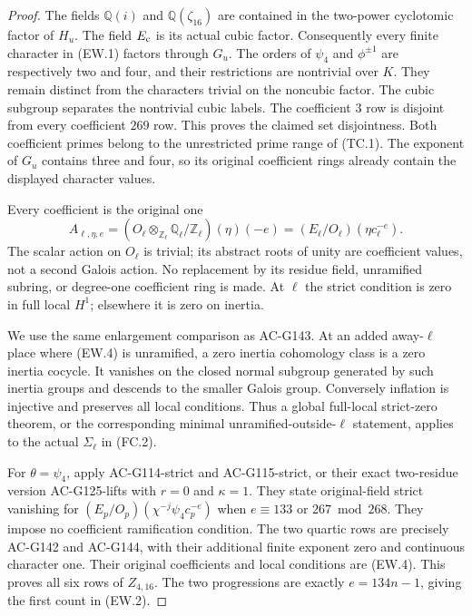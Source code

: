 \begin{proof}
The fields $\mathbb Q(i)$ and $\mathbb Q(\zeta_{16})$ are contained
in the two-power cyclotomic factor of $H_u$.
The field $E_{\rm c}$ is its actual cubic factor.
Consequently every finite character in (EW.1) factors through $G_u$.
The orders of $\psi_4$ and $\phi^{\pm1}$ are respectively two and four,
and their restrictions are nontrivial over $K$.
They remain distinct from the characters trivial on the noncubic
factor.  The cubic subgroup separates the nontrivial cubic labels.
The coefficient $3$ row is disjoint from every coefficient $269$ row.
This proves the claimed set disjointness.
Both coefficient primes belong to the unrestricted prime range of (TC.1).
The exponent of $G_u$ contains three and four, so its original
coefficient rings already contain the displayed character values.

Every coefficient is the original one
\[
 A_{\ell,\eta,e}
 =(O_\ell\otimes_{\mathbb Z_\ell}\mathbb Q_\ell/\mathbb Z_\ell)
                      (\eta)(-e)
 =(E_\ell/O_\ell)(\eta c_\ell^{-e}).
 \tag{EW.4}
\]
The scalar action on $O_\ell$ is trivial; its abstract roots of
unity are coefficient values, not a second Galois action.
No replacement by its residue field, unramified subring, or
degree-one coefficient ring is made.
At $\ell$ the strict condition is zero in full local $H^1$;
elsewhere it is zero on inertia.

We use the same enlargement comparison as AC-G143.
At an added away-$\ell$ place where (EW.4) is unramified,
a zero inertia cohomology class is a zero inertia cocycle.
It vanishes on the closed normal subgroup generated by such
inertia groups and descends to the smaller Galois group.
Conversely inflation is injective and preserves all local conditions.
Thus a global full-local strict-zero theorem, or the corresponding
minimal unramified-outside-$\ell$ statement, applies to the actual
$\Sigma_\ell$ in (FC.2).

For $\theta=\psi_4$, apply AC-G114-strict and AC-G115-strict,
or their exact two-residue version AC-G125-lifts with $r=0$ and
$\kappa=1$.
They state original-field strict vanishing for
$(E_p/O_p)(\chi^{-j}\psi_4 c_p^{-e})$
when $e\equiv133$ or $267\bmod268$.
They impose no coefficient ramification condition.
The two quartic rows are precisely AC-G142 and AC-G144, with
their additional finite exponent zero and continuous character one.
Their original coefficients and local conditions are (EW.4).
This proves all six rows of $Z_{4,16}$.
The two progressions are exactly $e=134n-1$,
giving the first count in (EW.2).


\end{proof}
